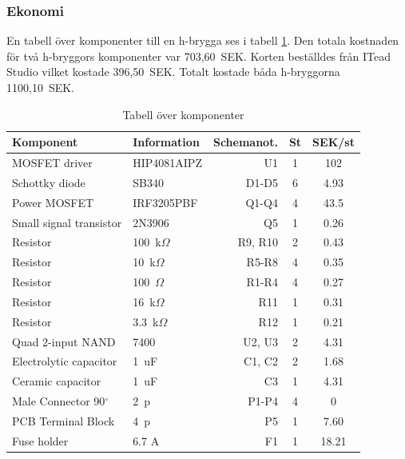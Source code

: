 \subsubsection{Ekonomi}
En tabell över komponenter till en h-brygga ses i tabell \ref{tbl:BOM h-brygga}.
Den totala kostnaden för två h-bryggors komponenter var 703,60~SEK. Korten
beställdes från ITead Studio vilket kostade 396,50~SEK. Totalt kostade
båda h-bryggorna 1100,10~SEK.

\begin{table}[htbp!]
\centering
\caption{Tabell över komponenter}
\label{tbl:BOM h-brygga}
\begin{tabular}{|l|l|r|c|c|}
\hline
\textbf{Komponent} & \textbf{Information} &
\textbf{Schemanot.} & \textbf{St} & \textbf{SEK/st} \\
\hline
MOSFET driver & HIP4081AIPZ & U1 & 1 & 102 \\
\hline
Schottky diode & SB340 & D1-D5 & 6 & 4.93\\
\hline
Power MOSFET & IRF3205PBF & Q1-Q4 & 4 & 43.5\\
\hline
Small signal transistor & 2N3906 & Q5 & 1 & 0.26\\
\hline
Resistor & 100~k$\Omega$ & R9, R10 & 2 & 0.43\\
\hline
Resistor & 10~k$\Omega$ & R5-R8 & 4 & 0.35\\
\hline
Resistor & 100~$\Omega$ & R1-R4 & 4 & 0.27\\
\hline
Resistor & 16~k$\Omega$ & R11 & 1 & 0.31\\
\hline
Resistor & 3.3~k$\Omega$ & R12 & 1 & 0.21\\
\hline
Quad 2-input NAND & 7400 & U2, U3 & 2 & 4.31\\
\hline
Electrolytic capacitor & 1~uF & C1, C2 & 2 & 1.68\\
\hline
Ceramic capacitor & 1~uF & C3 & 1 & 4.31\\
\hline
Male Connector 90$^{\circ}$ & 2~p & P1-P4 & 4 & 0\\
\hline
PCB Terminal Block &  4~p & P5 & 1 & 7.60\\
\hline
Fuse holder & 6.7 A & F1 & 1 & 18.21\\
\hline
\end{tabular}	
\end{table}
